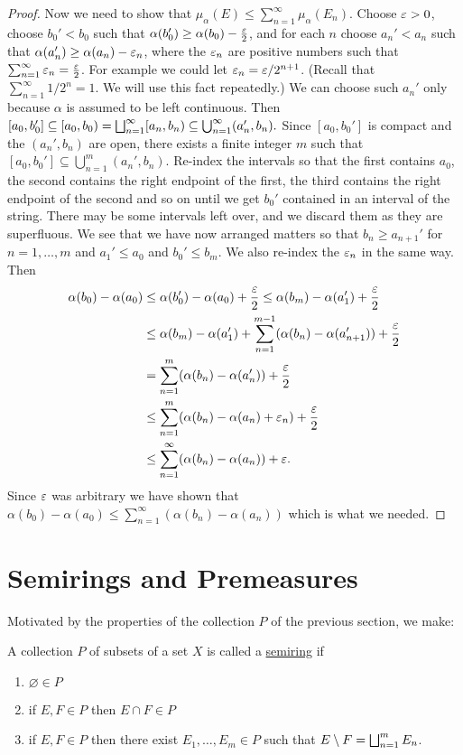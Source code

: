 \begin{proof}
Now we need to show that $\mu_\alpha(E) \leq \sum_{n=1}^\infty \mu_\alpha(E_n)$. Choose $\varepsilon>0$, choose $b_0'<b_0$ such that $\alpha(b_0') \geq \alpha(b_0)-\frac{\varepsilon}2$, and for each $n$ choose $a_n'<a_n$ such that $\alpha(a_n')\geq \alpha(a_n)-\varepsilon_n$, where the $\varepsilon_n$ are positive numbers such that $\sum_{n=1}^\infty\varepsilon_n=\frac{\varepsilon}2$. For example we could let $\varepsilon_n=\varepsilon/2^{n+1}$. (Recall that $\sum_{n=1}^\infty 1/2^n=1$. We will use this fact repeatedly.) We can choose such $a_n'$ only because $\alpha$ is assumed to be left continuous. Then $[a_0, b_0'] \subseteq[a_0, b_0)=\bigsqcup_{n=1}^\infty[a_n, b_n) \subseteq \bigcup_{n=1}^\infty(a_n', b_n) .$ Since $[a_0, b_0']$ is compact and the $(a_n', b_n)$ are open, there exists a finite integer $m$ such that $[a_0, b_0'] \subseteq \bigcup_{n=1}^m(a_n', b_n)$. Re-index the intervals so that the first contains $a_0$, the second contains the right endpoint of the first, the third contains the right endpoint of the second and so on until we get $b_0'$ contained in an interval of the string. There may be some intervals left over, and we discard them as they are superfluous. We see that we have now arranged matters so that $b_n \geq a_{n+1}'$ for $n=1, \dots, m$ and $a_1' \leq a_0$ and $b_0' \leq b_m .$ We also re-index the $\varepsilon_n$ in the same way. Then
\begin{align*}
    \alpha(b_0)-\alpha(a_0)&\leq\alpha(b_0')-\alpha(a_0)+\frac{\varepsilon}2\leq \alpha(b_m)-\alpha(a_1')+\frac{\varepsilon}2\\
    &\leq\alpha(b_m)-\alpha(a_1')+\sum_{n=1}^{m-1}(\alpha(b_n)-\alpha(a_{n+1}'))+\frac{\varepsilon}2\\
    &=\sum_{n=1}^m(\alpha(b_n)-\alpha(a_n'))+\frac{\varepsilon}2\\
    &\leq\sum_{n=1}^m(\alpha(b_n)-\alpha(a_n)+\varepsilon_n)+\frac{\varepsilon}2\\
    &\leq \sum_{n=1}^\infty(\alpha(b_n)-\alpha(a_n))+\varepsilon.
\end{align*}Since $\varepsilon$ was arbitrary we have shown that $\alpha(b_0)-\alpha(a_0) \leq \sum_{n=1}^\infty(\alpha(b_n)-\alpha(a_n))$ which is what we needed.
\end{proof}

\section{Semirings and Premeasures}

Motivated by the properties of the collection $P$ of the previous section, we make:

\begin{definition}
A collection $P$ of subsets of a set $X$ is called a \underline{semiring} if
\begin{enumerate}[label=\arabic*)]
    \item $\varnothing \in P$
    \item if $E,F\in P$ then $E\cap F\in P$
    \item if $E,F\in P$ then there exist $E_1,\dots,E_m\in P$ such that $E\setminus F=\bigsqcup_{n=1}^m E_n$.
\end{enumerate}
\end{definition}

